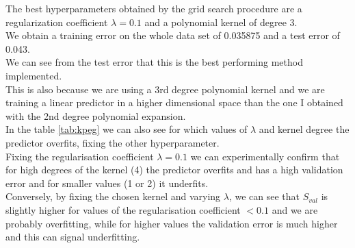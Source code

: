 % 
The best hyperparameters obtained by the grid search procedure are a regularization coefficient $\lambda = 0.1$ and a polynomial kernel of degree 3.\\
We obtain a training error on the whole data set of 0.035875 and a test error of 0.043.\\
We can see from the test error that this is the best performing method implemented.\\
This is also because we are using a 3rd degree polynomial kernel and we are training a linear predictor in a higher dimensional space than the one I obtained with the 2nd degree polynomial expansion.\\
In the table \ref{tab:kpeg} we can also see for which values of $\lambda$ and kernel degree the predictor overfits, fixing the other hyperparameter.\\
Fixing the regularisation coefficient $\lambda = 0.1$ we can experimentally confirm that for high degrees of the kernel (4) the predictor overfits and has a high validation error and for smaller values (1 or 2) it underfits.\\
Conversely, by fixing the chosen kernel and varying $\lambda$, we can see that $S_{val}$ is slightly higher for values of the regularisation coefficient $< 0.1$ and we are probably overfitting, while for higher values the validation error is much higher and this can signal underfitting.\\

